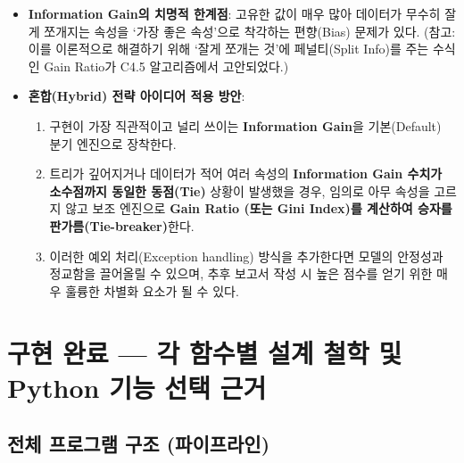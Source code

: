 \documentclass[12pt, a4paper]{article}
\begin{document}
\begin{itemize}
    \item \textbf{Information Gain의 치명적 한계점}:
    고유한 값이 매우 많아 데이터가 무수히 잘게 쪼개지는 속성을 `가장 좋은 속성'으로 착각하는 편향(Bias) 문제가 있다.
    (참고: 이를 이론적으로 해결하기 위해 `잘게 쪼개는 것'에 페널티(Split Info)를 주는 수식인 Gain Ratio가 C4.5 알고리즘에서 고안되었다.)

    \item \textbf{혼합(Hybrid) 전략 아이디어 적용 방안}:
    \begin{enumerate}
        \item 구현이 가장 직관적이고 널리 쓰이는 \textbf{Information Gain}을 기본(Default) 분기 엔진으로 장착한다.
        \item 트리가 깊어지거나 데이터가 적어 여러 속성의 \textbf{Information Gain 수치가 소수점까지 동일한 동점(Tie)} 상황이 발생했을 경우, 임의로 아무 속성을 고르지 않고 보조 엔진으로 \textbf{Gain Ratio (또는 Gini Index)를 계산하여 승자를 판가름(Tie-breaker)}한다.
        \item 이러한 예외 처리(Exception handling) 방식을 추가한다면 모델의 안정성과 정교함을 끌어올릴 수 있으며, 추후 보고서 작성 시 높은 점수를 얻기 위한 매우 훌륭한 차별화 요소가 될 수 있다.
    \end{enumerate}
\end{itemize}


\section{구현 완료 --- 각 함수별 설계 철학 및 Python 기능 선택 근거}

\subsection{전체 프로그램 구조 (파이프라인)}
\end{document}
